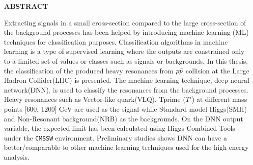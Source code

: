 \begin{center}
{\large {\bf  ABSTRACT }}

\end{center}  


 
 Extracting signals in a small cross-section compared to the large cross-section of the background processes has been helped by introducing machine learning (ML) techniques for classification purposes. Classification algorithms in machine learning is a type of supervised learning where the outputs are constrained only to a limited set of values or classes such as signals or backgrounds. In this thesis, the classification of the produced heavy resonances from $p\Bar{p}$ collision at the Large Hadron Collider(LHC) is presented. The machine learning technique, deep neural network(DNN), is used to classify the resonances from the background processes. Heavy resonances such as Vector-like quark(VLQ), Tprime ($T'$) at different mass points [600, 1200] GeV are used as the signal while Standard model Higgs(SMH) and Non-Resonant background(NRB) as the backgrounds. On the DNN output variable, the expected limit has been calculated using Higgs Combined Tools under the \texttt{CMSSW} environment. Preliminary studies shows DNN can have a better/comparable to other machine learning techniques used for the high energy analysis. 
